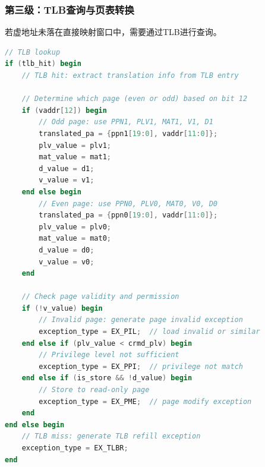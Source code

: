 \subsubsection{第三级：TLB查询与页表转换}

若虚地址未落在直接映射窗口中，需要通过TLB进行查询。

\begin{lstlisting}[language=Verilog, caption=TLB地址翻译逻辑]
// TLB lookup
if (tlb_hit) begin
    // TLB hit: extract translation info from TLB entry
    
    // Determine which page (even or odd) based on bit 12
    if (vaddr[12]) begin
        // Odd page: use PPN1, PLV1, MAT1, V1, D1
        translated_pa = {ppn1[19:0], vaddr[11:0]};
        plv_value = plv1;
        mat_value = mat1;
        d_value = d1;
        v_value = v1;
    end else begin
        // Even page: use PPN0, PLV0, MAT0, V0, D0
        translated_pa = {ppn0[19:0], vaddr[11:0]};
        plv_value = plv0;
        mat_value = mat0;
        d_value = d0;
        v_value = v0;
    end
    
    // Check page validity and permission
    if (!v_value) begin
        // Invalid page: generate page invalid exception
        exception_type = EX_PIL;  // load invalid or similar
    end else if (plv_value < crmd_plv) begin
        // Privilege level not sufficient
        exception_type = EX_PPI;  // privilege not match
    end else if (is_store && !d_value) begin
        // Store to read-only page
        exception_type = EX_PME;  // page modify exception
    end
end else begin
    // TLB miss: generate TLB refill exception
    exception_type = EX_TLBR;
end
\end{lstlisting}

